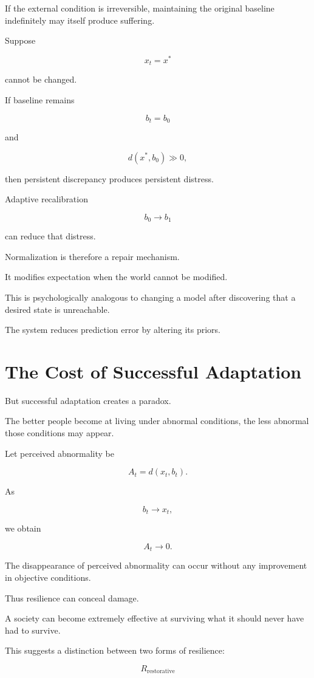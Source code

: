 \documentclass[11pt,oneside]{book}
\theoremstyle{definition}
\theoremstyle{remark}
\begin{document}
If the external condition is irreversible, maintaining the original baseline indefinitely may itself produce suffering.

Suppose

\[
x_t=x^\ast
\]

cannot be changed.

If baseline remains

\[
b_t=b_0
\]

and

\[
d(x^\ast,b_0)\gg0,
\]

then persistent discrepancy produces persistent distress.

Adaptive recalibration

\[
b_0\rightarrow b_1
\]

can reduce that distress.

Normalization is therefore a repair mechanism.

It modifies expectation when the world cannot be modified.

This is psychologically analogous to changing a model after discovering that a desired state is unreachable.

The system reduces prediction error by altering its priors.

\section{The Cost of Successful Adaptation}

But successful adaptation creates a paradox.

The better people become at living under abnormal conditions, the less abnormal those conditions may appear.

Let perceived abnormality be

\[
A_t
=
d(x_t,b_t).
\]

As

\[
b_t\rightarrow x_t,
\]

we obtain

\[
A_t\rightarrow0.
\]

The disappearance of perceived abnormality can occur without any improvement in objective conditions.

Thus resilience can conceal damage.

A society can become extremely effective at surviving what it should never have had to survive.

This suggests a distinction between two forms of resilience:

\[
R_{\mathrm{restorative}}
\]
\end{document}
